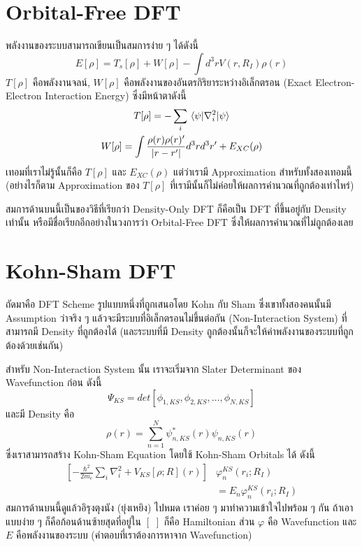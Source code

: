 \section{Orbital-Free DFT}

พลังงานของระบบสามารถเขียนเป็นสมการง่าย ๆ ได้ดังนี้
%
\begin{equation}
    E[\rho] = T_{s}[\rho] + W[\rho] - \int d^{3} r V(r,R_{I}) \rho(r)
\end{equation}
%
\noindent $T[\rho]$ คือพลังงานจลน์, $W[\rho]$ คือพลังงานของอันตรกิริยาระหว่างอิเล็กตรอน (Exact Electron-Electron Interaction Energy) ซึ่งมีหน้าตาดังนี้
%
\begin{gather}
    T[\rho] = -\sum_{i} \mel{\psi}{\nabla^{2}_{i}}{\psi} \\
    W[\rho] = \int \frac{\rho(r)\rho(r)'}{|r-r'|} d^{3} r d^{3} r' + E_{XC}(\rho)
\end{gather}
%
เทอมที่เราไม่รู้นั้นก็คือ $T[\rho]$ และ  $E_{XC}(\rho)$ แต่ว่าเรามี Approximation สำหรับทั้งสองเทอมนี้ (อย่างไรก็ตาม Approximation ของ $T[\rho]$ ที่เรามีนั้นก็ไม่ค่อยให้ผลการคำนวณที่ถูกต้องเท่าไหร่)

สมการด้านบนนี้เป็นของวิธีที่เรียกว่า Density-Only DFT ก็คือเป็น DFT ที่ขึ้นอยู่กับ Density เท่านั้น หรือมีชื่อเรียกอีกอย่างในวงการว่า Orbital-Free DFT ซึ่งให้ผลการคำนวณที่ไม่ถูกต้องเลย

\section{Kohn-Sham DFT}

ถัดมาคือ DFT Scheme รูปแบบหนึ่งที่ถูกเสนอโดย Kohn กับ Sham ซึ่งเขาทั้งสองคนนั้นมี Assumption ว่าจริง ๆ แล้วจะมีระบบที่อิเล็กตรอนไม่ขึ้นต่อกัน (Non-Interaction System) ที่สามารถมี Density ที่ถูกต้องได้ (และระบบที่มี Density ถูกต้องนั้นก็จะให้ค่าพลังงานของระบบที่ถูกต้องด้วยเช่นกัน)

สำหรับ Non-Interaction System นั้น เราจะเริ่มจาก Slater Determinant ของ Wavefunction ก่อน ดังนี้
%
\begin{equation}
    \Psi_{KS} = det[\phi_{1,KS}, \phi_{2,KS}, \dots, \phi_{N,KS}]
\end{equation}
%
\noindent และมี Density คือ
%
\begin{equation}
    \rho(r) = \sum^{N}_{n=1} \psi_{n,KS}^{\ast}(r) \psi_{n,KS}(r)
\end{equation}
%
\noindent ซึ่งเราสามารถสร้าง Kohn-Sham Equation โดยใช้ Kohn-Sham Orbitals ได้ ดังนี้
%
\begin{align}
    \left[-\frac{\hbar^2}{2 m_e} \sum_i \nabla_i^2
        + V_{K S}[\rho ; R](r)\right] &
    \varphi_n^{K S}\left(r_i ; R_I\right) \nonumber \\
    &= E_n \varphi_n^{K S}\left(r_i ; R_I\right)
\end{align}
%
\noindent สมการด้านบนนี้ดูแล้วอิรุงตุงนัง (ยุ่งเหยิง) ไปหมด เราค่อย ๆ มาทำความเข้าใจไปพร้อม ๆ กัน ถ้าเอาแบบง่าย ๆ ก็คือก้อนด้านซ้ายสุดที่อยู่ใน $[\,\,]$ ก็คือ Hamiltonian ส่วน $\varphi$ คือ Wavefunction และ $E$ คือพลังงานของระบบ (คำตอบที่เราต้องการหาจาก Wavefunction)

